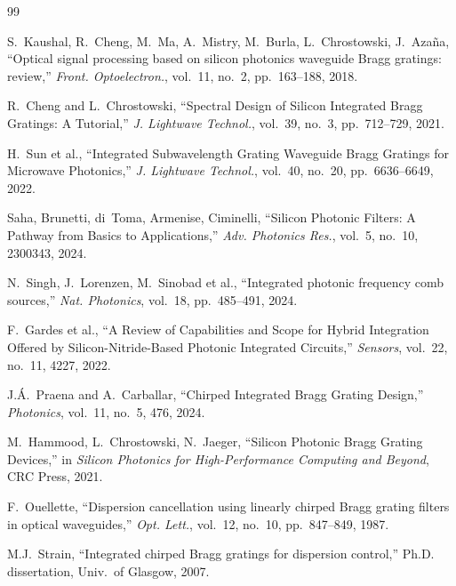 \documentclass[12pt,a4paper,twoside]{article}
\begin{document}
\newpage

\begin{thebibliography}{99}

S.~Kaushal, R.~Cheng, M.~Ma, A.~Mistry, M.~Burla, L.~Chrostowski, J.~Aza\~{n}a,
``Optical signal processing based on silicon photonics waveguide Bragg gratings: review,''
\textit{Front. Optoelectron.}, vol.~11, no.~2, pp.~163--188, 2018.

R.~Cheng and L.~Chrostowski,
``Spectral Design of Silicon Integrated Bragg Gratings: A Tutorial,''
\textit{J. Lightwave Technol.}, vol.~39, no.~3, pp.~712--729, 2021.

H.~Sun et al.,
``Integrated Subwavelength Grating Waveguide Bragg Gratings for Microwave Photonics,''
\textit{J. Lightwave Technol.}, vol.~40, no.~20, pp.~6636--6649, 2022.

Saha, Brunetti, di~Toma, Armenise, Ciminelli,
``Silicon Photonic Filters: A Pathway from Basics to Applications,''
\textit{Adv. Photonics Res.}, vol.~5, no.~10, 2300343, 2024.

N.~Singh, J.~Lorenzen, M.~Sinobad et al.,
``Integrated photonic frequency comb sources,''
\textit{Nat. Photonics}, vol.~18, pp.~485--491, 2024.

F.~Gardes et al.,
``A Review of Capabilities and Scope for Hybrid Integration Offered by
Silicon-Nitride-Based Photonic Integrated Circuits,''
\textit{Sensors}, vol.~22, no.~11, 4227, 2022.

J.\'{A}.~Praena and A.~Carballar,
``Chirped Integrated Bragg Grating Design,''
\textit{Photonics}, vol.~11, no.~5, 476, 2024.

M.~Hammood, L.~Chrostowski, N.~Jaeger,
``Silicon Photonic Bragg Grating Devices,''
in \textit{Silicon Photonics for High-Performance Computing and Beyond}, CRC Press, 2021.

F.~Ouellette,
``Dispersion cancellation using linearly chirped Bragg grating filters in optical waveguides,''
\textit{Opt. Lett.}, vol.~12, no.~10, pp.~847--849, 1987.

M.J.~Strain,
``Integrated chirped Bragg gratings for dispersion control,''
Ph.D. dissertation, Univ.~of Glasgow, 2007.


\end{thebibliography}
\end{document}
